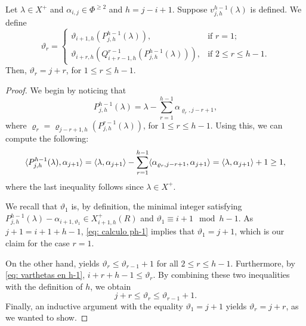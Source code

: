 \begin{lemma}\label{lem: thetas para el caso h-1}
    Let $\lambda \in X^+$ and $\alpha_{i,j}\in \Phi^{\geq 2}$ and $h=j-i+1$. 
    Suppose $v^{h-1}_{j,h}(\lambda)$ is defined.
    We define
    \begin{equation}\label{eq: varthetas en h-1}
        \vartheta_{r}= \left\{  \begin{array}{ll}
          \vartheta_{i+1,h}(P^{h-1}_{j,h}(\lambda)),   & \mbox{if } r=1;  \\[3pt]
        \vartheta_{i+r,h}(Q^{r-1}_{i+r-1,h}(P^{h-1}_{j,h}(\lambda))),     &  \mbox{if } 2\leq r \leq h-1.
        \end{array}  \right.
    \end{equation}
    Then,  $\vartheta_{r}=j+r$, for $1\leq r\leq h-1 $.
\end{lemma}


\begin{proof}
    We begin by noticing that 
    \begin{equation}
        P^{h-1}_{j,h}(\lambda) = \lambda - \sum_{r=1}^{h-1}\alpha_{\varrho_{r},j-r+1},
    \end{equation}
    where $\varrho_{r} = \varrho_{j-r+1,h}(P^{r-1}_{j,h}(\lambda))$,  for $1\leq r\leq h-1$.
    Using this, we can compute the following: 
    \begin{equation}\label{eq: calculo ph-1}
        \langle P^{h-1}_{j,h}(\lambda) , \alpha_{j+1} \rangle = \langle \lambda , \alpha_{j+1} \rangle - \sum_{r=1}^{h-1} \langle \alpha_{\varrho_{r},j-r+1} , \alpha_{j+1} \rangle = \langle \lambda , \alpha_{j+1} \rangle + 1 \geq 1,
    \end{equation}
    where the last inequality follows since $\lambda \in X^+$.


   We recall that $\vartheta_1$ is, by definition, the minimal integer satisfying $P^{h-1}_{j,h}(\lambda)-\alpha_{i+1,\vartheta_1} \in X_{i+1,h}^+(R)$ and $\vartheta_1\equiv i+1 \mod h-1$.
   As $j+1 = i+1 + h-1$, \eqref{eq: calculo ph-1} implies that   $\vartheta_{1} = j+1$, which is our claim for the case $r=1$. 
   

On the other hand,   yields $\vartheta_{r} \leq \vartheta_{r-1}+1$ for all $2\leq r\leq h-1$.
Furthermore, by \cref{eq: varthetas en h-1},    $ i+r+h-1  \leq \vartheta_r$. 
By combining these two inequalities with the definition of $h$, we obtain 
\begin{equation}
    j+r\leq \vartheta_r\leq \vartheta_{r-1}+1. 
\end{equation}
Finally, an inductive argument with the equality $\vartheta_1=j+1$ yields $\vartheta_r=j+r$, as we wanted to show. 
\end{proof}





